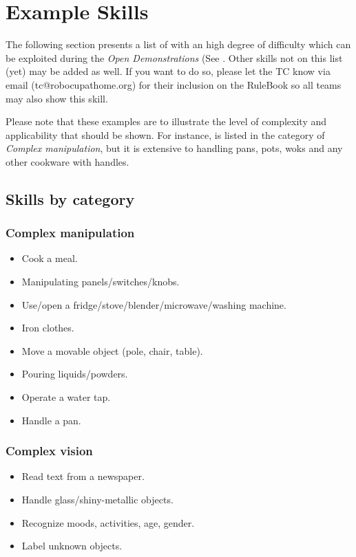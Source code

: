 \chapter{Example Skills}
\label{chap:example-skills}

The following section presents a list of  with an high degree of difficulty which can be exploited during the \textit{Open Demonstrations} (See .
Other skills not on this list (yet) may be added as well. If you want to do so, please let the TC know via email (tc@robocupathome.org) for their inclusion on the RuleBook so all teams may also show this skill.

Please note that these examples are to illustrate the level of complexity and applicability that should be shown. For instance,  is listed in the category of \textit{Complex manipulation}, but it is extensive to handling pans, pots, woks and any other cookware with handles.

\section{Skills by category}

\subsection{Complex manipulation}
\begin{itemize}
	\item Cook a meal.
	\item Manipulating panels/switches/knobs.
	\item Use/open a fridge/stove/blender/microwave/washing machine.
	\item Iron clothes.
	\item Move a movable object (pole, chair, table).
	\item Pouring liquids/powders.
	\item Operate a water tap.
	\item Handle a pan.
\end{itemize}

\subsection{Complex vision}
\begin{itemize}
	\item Read text from a newspaper.
	\item Handle glass/shiny-metallic objects.
	\item Recognize moods, activities, age, gender.
	\item Label unknown objects.
\end{itemize}

